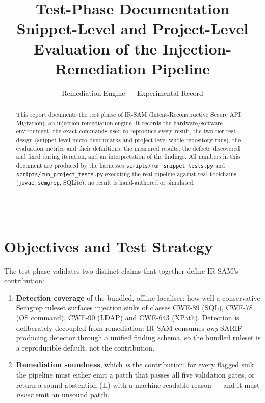 \documentclass[11pt,a4paper]{article}
\title{\textbf{\irsam{} Test-Phase Documentation}\\[3pt]
\large Snippet-Level and Project-Level Evaluation of the
Injection-Remediation Pipeline}
\author{Remediation Engine --- Experimental Record}
\date{}
\newcommand{\bottom}{\ensuremath{\bot}}
\newcommand{\irsam}{\mbox{IR\nobreakdash-SAM}}
\newcommand{\code}[1]{\texttt{\small #1}}
\begin{document}
\maketitle
\vspace{-2.0em}
\begin{center}\rule{0.85\linewidth}{0.4pt}\end{center}

\begin{abstract}
\noindent
This report documents the test phase of \irsam{} (Intent-Reconstructive
Secure API Migration), an injection-remediation engine. It records the
hardware/software environment, the exact commands used to reproduce every
result, the two-tier test design (snippet-level micro-benchmarks and
project-level whole-repository runs), the evaluation metrics and their
definitions, the measured results, the defects discovered and fixed
during iteration, and an interpretation of the findings. All numbers in
this document are produced by the harnesses
\code{scripts/run\_snippet\_tests.py} and
\code{scripts/run\_project\_tests.py} executing the real pipeline against
real toolchains (\code{javac}, \code{semgrep}, SQLite); no result is
hand-authored or simulated.
\end{abstract}

\tableofcontents
\bigskip

\section{Objectives and Test Strategy}
The test phase validates two distinct claims that together define
\irsam{}'s contribution:
\begin{enumerate}[leftmargin=1.6em]
  \item \textbf{Detection coverage} of the bundled, offline localiser:
  how well a conservative Semgrep ruleset surfaces injection sinks of
  classes CWE-89 (SQL), CWE-78 (OS command), CWE-90 (LDAP) and CWE-643
  (XPath). Detection is deliberately decoupled from remediation:
  \irsam{} consumes \emph{any} SARIF-producing detector through a unified
  finding schema, so the bundled ruleset is a reproducible default, not
  the contribution.
  \item \textbf{Remediation soundness}, which \emph{is} the contribution:
  for every flagged sink the pipeline must either emit a patch that
  passes all five validation gates, or return a sound abstention
  (\bottom) with a machine-readable reason --- and it must \emph{never}
  emit an unsound patch.
\end{enumerate}
\end{document}
